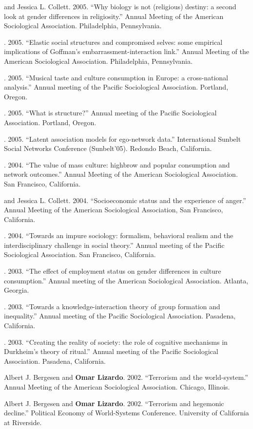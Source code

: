  and Jessica L. Collett. 2005. ``Why biology is not (religious) destiny: a second look at gender differences in religiosity.'' Annual Meeting of the American Sociological Association. Philadelphia, Pennsylvania.   

. 2005. ``Elastic social structures and compromised selves: some empirical implications of Goffman's embarrassment-interaction link.'' Annual Meeting of the American Sociological Association. Philadelphia, Pennsylvania.   

. 2005. ``Musical taste and culture consumption in Europe: a cross-national analysis.'' Annual meeting of the Pacific Sociological Association. Portland, Oregon. 

. 2005. ``What is structure?'' Annual meeting of the Pacific Sociological Association. Portland, Oregon.  

. 2005. ``Latent association models for ego-network data.'' International Sunbelt Social Networks Conference (Sunbelt'05). Redondo Beach, California.

. 2004. ``The value of mass culture: highbrow and popular consumption and network outcomes.'' Annual Meeting of the American Sociological Association. San Francisco, California. 

 and Jessica L. Collett. 2004. ``Socioeconomic status and the experience of anger.'' Annual Meeting of the American Sociological Association, San Francisco, California.  

. 2004. ``Towards an impure sociology: formalism, behavioral realism and the interdisciplinary challenge in social theory.'' Annual meeting of the Pacific Sociological Association. San Francisco, California.   

. 2003. ``The effect of employment status on gender differences in culture consumption.'' Annual meeting of the American Sociological Association. Atlanta, Georgia.  

. 2003. ``Towards a knowledge-interaction theory of group formation and inequality.'' Annual meeting of the Pacific Sociological Association. Pasadena, California.   

. 2003. ``Creating the reality of society: the role of cognitive mechanisms in Durkheim's theory of ritual.'' Annual meeting of the Pacific Sociological Association. Pasadena, California. 
 
\ind Albert J. Bergesen and {\bf Omar Lizardo}. 2002. ``Terrorism and the world-system.'' Annual Meeting of the American Sociological Association. Chicago, Illinois.

\ind Albert J. Bergesen and {\bf Omar Lizardo}. 2002. ``Terrorism and hegemonic decline.'' Political Economy of World-Systems Conference. University of California at Riverside. 